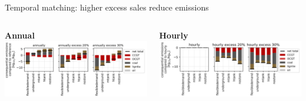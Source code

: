 \begin{frame}{Temporal matching: higher excess sales reduce emissions}

  	\begin{columns}[t]
  	\begin{column}{0.5\textwidth}
  		\centering
  		\textbf{Annual} \\
  		\includegraphics[width=1\linewidth]{images/annual_excess}
  	\end{column}
  	\begin{column}{0.5\textwidth}
  		\centering
  		\textbf{Hourly} \\
  		\includegraphics[width=1\linewidth]{images/hourly_excess}
  	\end{column}
  \end{columns}

\end{frame}


